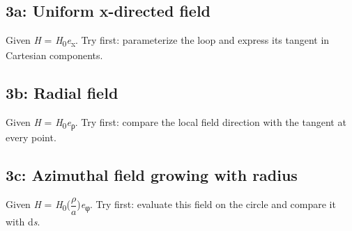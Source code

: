 \documentclass[11pt]{article}
\begin{document}
\begin{keepsection}
\begin{keepsection}
\subsection{3a: Uniform x-directed field}

Given \textit{H} = \textit{H}\textsubscript{0}\textit{e}\textsubscript{x}. Try first: parameterize the loop and express its tangent in Cartesian components.

\end{keepsection}

\begin{keepsection}
\subsection{3b: Radial field}

Given \textit{H} = \textit{H}\textsubscript{0}\textit{e}\textsubscript{ρ}. Try first: compare the local field direction with the tangent at every point.

\end{keepsection}

\begin{keepsection}
\subsection{3c: Azimuthal field growing with radius}

Given \textit{H} = \textit{H}\textsubscript{0}({\small\ensuremath{\dfrac{{ρ}}{{a}}}})\textit{e}\textsubscript{φ}. Try first: evaluate this field on the circle and compare it with d\textit{s}.

\end{keepsection}
\end{keepsection}


\clearpage
\end{document}
